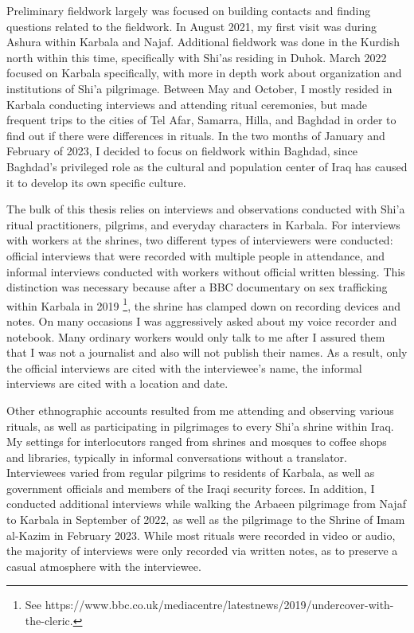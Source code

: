 Preliminary fieldwork largely was focused on building contacts and finding questions related to the fieldwork. In August 2021, my first visit was during Ashura within Karbala and Najaf. Additional fieldwork was done in the Kurdish north within this time, specifically with Shi'as residing in Duhok. March 2022 focused on Karbala specifically, with more in depth work about organization and institutions of Shi'a pilgrimage. Between May and October, I mostly resided in Karbala conducting interviews and attending ritual ceremonies, but made frequent trips to the cities of Tel Afar, Samarra, Hilla, and Baghdad in order to find out if there were differences in rituals. In the two months of January and February of 2023, I decided to focus on fieldwork within Baghdad, since Baghdad's privileged role as the cultural and population center of Iraq has caused it to develop its own specific culture. 

The bulk of this thesis relies on interviews and observations conducted with Shi'a ritual practitioners, pilgrims, and everyday characters in Karbala. For interviews with workers at the shrines, two different types of interviewers were conducted: official interviews that were recorded with multiple people in attendance, and informal interviews conducted with workers without official written blessing. This distinction was necessary because after a BBC documentary on sex trafficking within Karbala in 2019 \footnote{See https://www.bbc.co.uk/mediacentre/latestnews/2019/undercover-with-the-cleric.}, the shrine has clamped down on recording devices and notes. On many occasions I was aggressively asked about my voice recorder and notebook. Many ordinary workers would only talk to me after I assured them that I was not a journalist and also will not publish their names. As a result, only the official interviews are cited with the interviewee's name, the informal interviews are cited with a location and date. 

Other ethnographic accounts resulted from me attending and observing various rituals, as well as participating in pilgrimages to every Shi'a shrine within Iraq. My settings for interlocutors ranged from shrines and mosques to coffee shops and libraries, typically in informal conversations without a translator. Interviewees varied from regular pilgrims to residents of Karbala, as well as government officials and members of the Iraqi security forces. In addition, I conducted additional interviews while walking the Arbaeen pilgrimage from Najaf to Karbala in September of 2022, as well as the pilgrimage to the Shrine of Imam al-Kazim in February 2023. While most rituals were recorded in video or audio, the majority of interviews were only recorded via written notes, as to preserve a casual atmosphere with the interviewee. 

